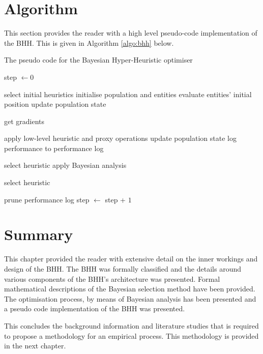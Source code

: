 \section{Algorithm}
\label{sec:bhh:algorithm}

This section provides the reader with a high level pseudo-code implementation of the \ac{BHH}. This is given in Algorithm \ref{algo:bhh} below.

\begin{algorithm}[H]
    \caption{The pseudo code for the  Bayesian Hyper-Heuristic optimiser}
    \label{algo:bhh}
    \begin{algorithmic}
        \State step $\gets 0$
    
        \State select initial heuristics 
        \State initialise population and entities
        \State evaluate entities' initial position
        \State update population state
        
        	        \State get gradients
        	    \EndIf
    
        		\State apply low-level heuristic and proxy operations
        		\State update population state
        		\State log performance to performance log
        		
        			\State select heuristic
        		\Else
        				\State apply Bayesian analysis
        			\EndIf
                    
        				\State select heuristic
        			\EndIf
                    
        				\State prune performance log
        			\EndIf
        	    \EndIf
        	\EndFor
        	\State step $\gets$ step + $1$
        \EndWhile
    \end{algorithmic}
\end{algorithm}

\section{Summary}
\label{sec:bhh:summary}

This chapter provided the reader with extensive detail on the inner workings and design of the \ac{BHH}. The \ac{BHH} was formally classified and the details around various components of the \ac{BHH}'s architecture was presented. Formal mathematical descriptions of the Bayesian selection method have been provided. The optimisation process, by means of Bayesian analysis has been presented and a pseudo code implementation of the \ac{BHH} was presented.

This concludes the background information and literature studies that is required to propose a methodology for an empirical process. This methodology is provided in the next chapter.
